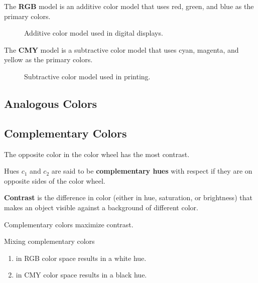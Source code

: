   \begin{example}
    The \textbf{RGB} model is an additive color model that uses red, green, and blue as the primary colors. 
    \begin{figure}[H]
      \centering 
      \caption{Additive color model used in digital displays.} 
    \end{figure}
  \end{example} 

  \begin{example}
    The \textbf{CMY} model is a subtractive color model that uses cyan, magenta, and yellow as the primary colors. 
    \begin{figure}[H]
      \centering 
      \caption{Subtractive color model used in printing.} 
    \end{figure}
  \end{example}

\subsection{Analogous Colors} 

\subsection{Complementary Colors}

  The opposite color in the color wheel has the most contrast. 

  \begin{definition}
    Hues $c_1$ and $c_2$ are said to be \textbf{complementary hues} with respect if they are on opposite sides of the color wheel.  
  \end{definition}

  \begin{definition}[Contrast]
    \textbf{Contrast} is the difference in color (either in hue, saturation, or brightness) that makes an object visible against a background of different color. 
  \end{definition}

  \begin{theorem}
    Complementary colors maximize contrast. 
  \end{theorem}

  \begin{theorem}
    Mixing complementary colors 
    \begin{enumerate}
      \item in RGB color space results in a white hue. 
      \item in CMY color space results in a black hue. 
    \end{enumerate}
  \end{theorem}

